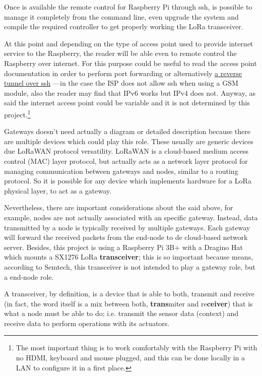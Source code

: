 \documentclass[11pt,a4paper,dvipsnames,twoside]{article}
\newcounter{subsubsubsection}[subsubsection]
\begin{document}
Once is available the remote control for Raspberry Pi through ssh, is possible to manage it completely from the command line, even upgrade the system and compile the required controller to get properly working the LoRa transceiver. 

At this point and depending on the type of access point used to provide internet service to the Raspberry, the reader will be able even to remote control the Raspberry over internet. For this purpose could be useful to read the access point documentation in order to perform port forwarding or alternatively \href{http://www.thirdway.ch/En/projects/raspberry_pi_3g/index.php}{a reverse tunnel over ssh} ---in the case the ISP does not allow ssh when using a GSM module, also the reader may find that IPv6 works but IPv4 does not. Anyway, as said the internet access point could be variable and it is not determined by this project.\footnote{The most important thing is to work comfortably with the Raspberry Pi with no HDMI, keyboard and mouse plugged, and this can be done locally in a LAN to configure it in a first place.}  

Gateways doesn't need actually a diagram or detailed description because there are multiple devices which could play this role. These usually are generic devices due LoRaWAN protocol versatility. LoRaWAN is a cloud-based medium access control (MAC) layer protocol, but actually acts as a network layer protocol for managing communication between gateways and nodes, similar to a routing protocol. So it is possible for any device which implements hardware for a LoRa physical layer, to act as a gateway.

Nevertheless, there are important considerations about the said above, for example, nodes are not actually associated with an specific gateway. Instead, data transmitted by a node is typically received by multiple gateways. Each gateway will forward the received packets from the end-node to de cloud-based network server. Besides, this project is using a Raspberry Pi 3B+ with a Dragino Hat which mounts a SX1276 LoRa \textbf{transceiver}\cite{SX1276}; this is so important because means, according to Semtech, this transceiver is not intended to play a gateway role, but a end-node role.

A transceiver, by definition, is a device that is able to both, transmit and receive (in fact, the word itself is a mix between both, \textbf{trans}miter and re\textbf{ceiver}) that is what a node must be able to do; i.e. transmit the sensor data (context) and receive data to perform operations with its actuators. 
\end{document}
